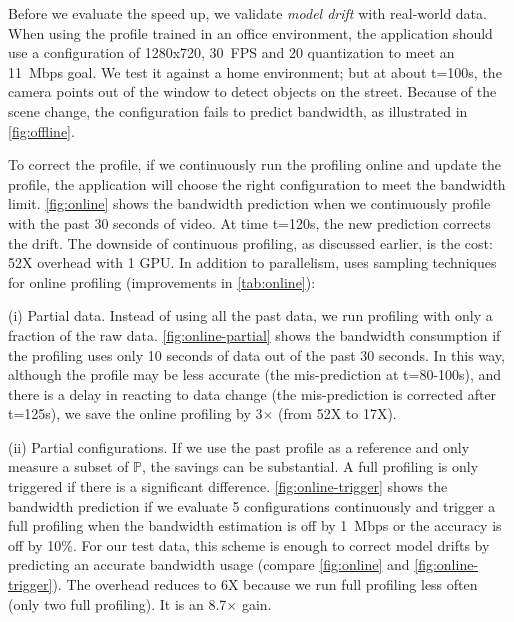   Before we evaluate the speed up, we validate
\textit{model drift} with real-world data. When using the profile trained in an
office environment, the application should use a configuration of 1280x720,
\SI{30}{FPS} and 20 quantization to meet an \SI{11}{Mbps} goal. We test it
against a home environment; but at about t=100s, the camera points out of the
window to detect objects on the street. Because of the scene change, the
configuration fails to predict bandwidth, as illustrated in
\autoref{fig:offline}.

To correct the profile, if we continuously run the profiling online and update
the profile, the application will choose the right configuration to meet the
bandwidth limit.  \autoref{fig:online} shows the bandwidth prediction when we
continuously profile with the past 30 seconds of video. At time t=120s, the new
prediction corrects the drift. The downside of continuous profiling, as
discussed earlier, is the cost: 52X overhead with 1 GPU\@. In addition to
parallelism, \sysname{} uses sampling techniques for online profiling
(improvements in \autoref{tab:online}):

(i) Partial data. Instead of using all the past data, we run profiling with only
a fraction of the raw data.  \autoref{fig:online-partial} shows the bandwidth
consumption if the profiling uses only 10 seconds of data out of the past 30
seconds. In this way, although the profile may be less accurate (the
mis-prediction at t=80-100s), and there is a delay in reacting to data change
(the mis-prediction is corrected after t=125s), we save the online profiling by
3$\times$ (from 52X to 17X).

(ii) Partial configurations. If we use the past profile as a reference and only
measure a subset of $\mathbb{P}$, the savings can be substantial. A full
profiling is only triggered if there is a significant
difference. \autoref{fig:online-trigger} shows the bandwidth prediction if we
evaluate 5 configurations continuously and trigger a full profiling when the
bandwidth estimation is off by \SI{1}{Mbps} or the accuracy is off by 10\%.  For
our test data, this scheme is enough to correct model drifts by predicting an
accurate bandwidth usage (compare \autoref{fig:online} and
\autoref{fig:online-trigger}).  The overhead reduces to 6X because we run full
profiling less often (only two full profiling). It is an 8.7$\times$ gain.

